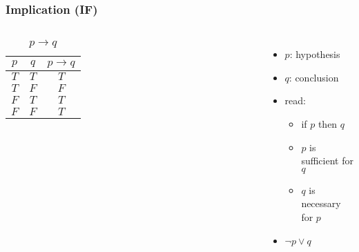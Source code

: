 \documentclass[dvipsnames]{beamer}
\begin{document}
\begin{frame}
  \frametitle{Implication (IF)}

  \begin{columns}
    \begin{table}
      \caption{$p \rightarrow q$}
      \begin{tabular}{|c|c||c|}\hline
        $p$ & $q$ & $p \rightarrow q$\\\hline\hline
        $T$ & $T$ & $T$\\\hline
        $T$ & $F$ & $F$\\\hline
        $F$ & $T$ & $T$\\\hline
        $F$ & $F$ & $T$\\\hline
      \end{tabular}
    \end{table}

    \pause
    \begin{itemize}
      \item $p$: \alert{hypothesis}
      \item $q$: \alert{conclusion}

      \item read:
      \begin{itemize}
        \item if $p$ then $q$
        \item $p$ is sufficient for $q$
        \item $q$ is necessary for $p$
      \end{itemize}

      \pause
      \item $\neg p \vee q$
    \end{itemize}
  \end{columns}
\end{frame}
\end{document}

